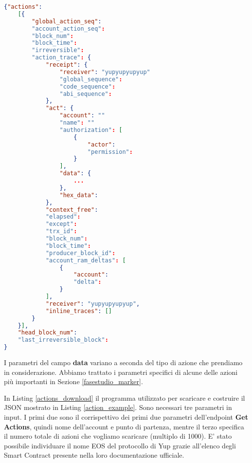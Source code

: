 \begin{lstlisting}[language=json, label= {action_example}, captionpos=b, caption=Action JSON object]
{"actions":
    [{
        "global_action_seq":
        "account_action_seq":
        "block_num":
        "block_time":
        "irreversible":
        "action_trace": {
            "receipt": {
                "receiver": "yupyupyupyup"
                "global_sequence": 
                "code_sequence":
                "abi_sequence":
            },
            "act": {
                "account": ""
                "name": ""
                "authorization": [
                    {
                        "actor":
                        "permission":
                    }
                ],
                "data": {
                    ...
                },
                "hex_data":
            },
            "context_free":
            "elapsed":
            "except":
            "trx_id":
            "block_num":
            "block_time":
            "producer_block_id":
            "account_ram_deltas": [
                {
                    "account":
                    "delta":
                }
            ],
            "receiver": "yupyupyupyup",
            "inline_traces": []
        }
    }],
    "head_block_num":
    "last_irreversible_block":
}
\end{lstlisting}

I parametri del campo \textbf{data} variano a seconda del tipo di azione che prendiamo in considerazione. Abbiamo trattato i parametri specifici di alcune delle azioni più importanti in Sezione \ref{fasestudio_marker}.

In Listing \ref{actions_download} il programma utilizzato per scaricare e costruire il JSON mostrato in Listing \ref{action_example}. Sono necessari tre parametri in input. I primi due sono il corrispettivo dei primi due parametri dell'endpoint \textbf{Get Actions}, quindi nome dell'account e punto di partenza, mentre il terzo specifica il numero totale di azioni che vogliamo scaricare (multiplo di 1000). E' stato possibile individuare il nome EOS del protocollo di Yup grazie all'elenco degli Smart Contract presente nella loro documentazione ufficiale.


